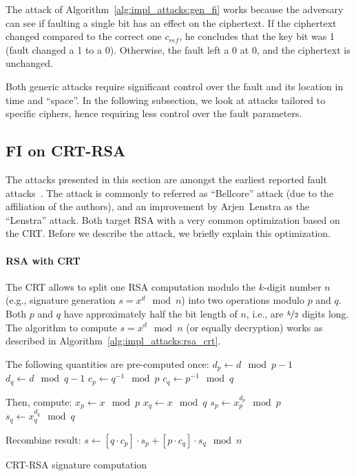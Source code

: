 The attack of Algorithm~\ref{alg:impl_attacks:gen_fi} works because the adversary can see if faulting a single bit has an effect on the ciphertext. If the ciphertext changed compared to the correct one $c_{ref}$, he concludes that the key bit was 1 (fault changed a 1 to a 0). Otherwise, the fault left a 0 at 0, and the ciphertext is unchanged. 

Both generic attacks require significant control over the fault and its location in time and ``space''. In the following subsection, we look at attacks tailored to specific ciphers, hence requiring less control over the fault parameters.

\subsection{\acs{FI} on \acs{CRT}-\acs{RSA}}
The attacks presented in this section are amongst the earliest reported fault attacks~\cite{BonehDemilloLipton97}. The attack is commonly to referred as ``Bellcore'' attack (due to the affiliation of the authors), and an improvement by Arjen~Lenstra as the ``Lenstra'' attack. Both target \ac{RSA} with a very common optimization based on the \ac{CRT}. Before we describe the attack, we briefly explain this optimization.

\paragraph{\acs{RSA} with \acs{CRT}} 
The \acl{CRT} allows to split one \ac{RSA} computation modulo the $k$-digit number $n$ (e.g., signature generation $s = x^d \mod n$) into two operations modulo $p$ and $q$. Both $p$ and $q$ have approximately half the bit length of $n$, i.e., are $\nicefrac{k}{2}$ digits long. The algorithm to compute $s = x^d \mod n$ (or equally decryption) works as described in Algorithm~\ref{alg:impl_attacks:rsa_crt}.

\begin{algorithm}
\center
\begin{algorithmic}
\vspace{2mm}

\State The following quantities are pre-computed once:
\State $d_p \gets d \mod p-1$
\State $d_q \gets d \mod q-1$
\State $c_p \gets q^{-1} \mod p$
\State $c_q \gets p^{-1} \mod q$
\vspace{2mm}

\State Then, compute:
\State $x_p \gets x \mod p$
\State $x_q \gets x \mod q$
\State $s_p \gets x_p^{d_p} \mod p$
\State $s_q \gets x_q^{d_q} \mod q$
\vspace{2mm}

\State Recombine result:
\State $s \gets \left[q \cdot c_p\right] \cdot s_p + \left[p \cdot c_q\right] \cdot s_q \mod n$

\vspace{2mm}
\end{algorithmic}
\caption{\ac{CRT}-\ac{RSA} signature computation}
\label{alg:impl_attacks:rsa_crt}
\end{algorithm}


